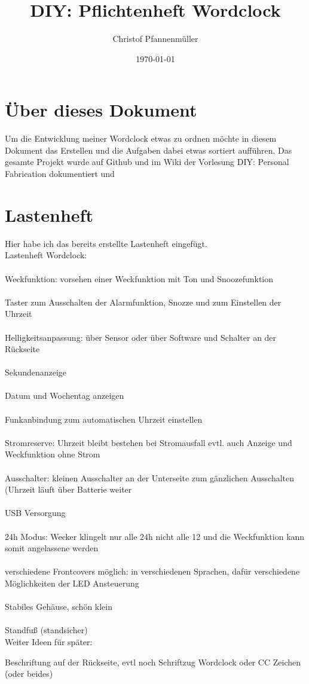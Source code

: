 \documentclass[11pt,a4paper,ngerman]{article}
\date{\today}
\author{Christof Pfannenmüller}
\title{DIY: Pflichtenheft Wordclock}
\begin{document}
\maketitle 
\tableofcontents 
\newpage
\section{Über dieses Dokument}
Um die Entwicklung meiner Wordclock etwas zu ordnen möchte in diesem Dokument das Erstellen und die Aufgaben dabei etwas sortiert aufführen. Das gesamte Projekt wurde auf Github\cite{githubWC} und im Wiki der Vorlesung DIY: Personal Fabrication\cite{wikiWC}  dokumentiert und 
\section{Lastenheft}
{\large Hier habe ich das bereits erstellte Lastenheft eingefügt.  }\\
Lastenheft Wordclock:\\
\\ 
Weckfunktion: vorsehen einer Weckfunktion mit Ton und Snoozefunktion\\
\\
Taster zum Ausschalten der Alarmfunktion, Snozze und zum Einstellen der Uhrzeit\\
\\
Helligkeitsanpassung: über Sensor oder über Software und Schalter an der Rückseite\\
\\
Sekundenanzeige\\
\\
Datum und Wochentag anzeigen\\ 
\\
Funkanbindung zum automatischen Uhrzeit einstellen\\
\\
Stromreserve: Uhrzeit bleibt bestehen bei Stromausfall  evtl. auch Anzeige und Weckfunktion ohne Strom\\ 
\\
Ausschalter: kleinen Ausschalter an der Unterseite zum gänzlichen Ausschalten (Uhrzeit läuft über Batterie weiter\\
\\
USB Versorgung\\
\\
24h Modus: Wecker klingelt nur alle 24h nicht alle 12 und die Weckfunktion kann somit angelassene werden\\
\\
verschiedene Frontcovers möglich: in verschiedenen Sprachen, dafür verschiedene Möglichkeiten der LED Ansteuerung\\
\\
Stabiles Gehäuse, schön klein\\
\\
Standfuß (standsicher)\\
Weiter Ideen für später: \par
Beschriftung auf der Rückseite, evtl  noch Schriftzug Wordclock oder CC Zeichen (oder beides)
\end{document}
